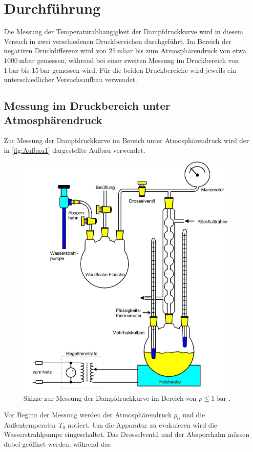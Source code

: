 \section{Durchführung}
\label{sec:Durchführung}
Die Messung der Temperaturabhängigkeit der Dampfdruckkurve wird in diesem Versuch in zwei verschiedenen Druckbereichen durchgeführt. Im Bereich der negativen
Druckdifferenz wird von $\qty{25}{\milli\bar}$ bis zum Atmosphärendruck von etwa $\qty{1000}{\milli\bar}$ gemessen, während bei einer zweiten Messung im 
Druckbereich von $\qty{1}{\bar}$ bis $\qty{15}{\bar}$ gemessen wird. Für die beiden Druckbereiche wird jeweils ein unterschiedlicher Versuchsaufbau verwendet.

\subsection{Messung im Druckbereich unter Atmosphärendruck}
\label{subsec:D_Unterdruck}
Zur Messung der Dampfdruckkurve im Bereich unter Atmosphärendruck wird der in \autoref{fig:Aufbau1} dargestellte Aufbau verwendet.
\begin{figure}
    \centering
    \includegraphics[width =.7\textwidth]{content/Aufbau1.jpg}
    \caption{Skizze zur Messung der Dampfdruckkurve im Bereich von $p \leq \qty{1}{\bar}$ \cite{v203}.}
    \label{fig:Aufbau1}
\end{figure}
Vor Beginn der Messung werden der Atmosphärendruck $p_0$ und die Außentemperatur $T_0$ notiert.
Um die Apparatur zu evakuieren wird die Wasserstrahlpumpe eingeschaltet. Das Drosselventil und der Absperrhahn müssen dabei geöffnet werden, während das 
